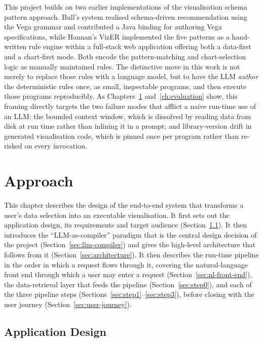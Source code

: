 This project builds on two earlier implementations of the visualisation schema pattern approach. Bull's system \cite{bull2023visualisation} realised schema-driven recommendation using the Vega grammar and contributed a Java binding for authoring Vega specifications, while Hannan's VizER \cite{hannan2024vizer} implemented the five patterns as a hand-written rule engine within a full-stack web application offering both a data-first and a chart-first mode. Both encode the pattern-matching and chart-selection logic as manually maintained rules. The distinctive move in this work is not merely to replace those rules with a language model, but to have the LLM \emph{author} the deterministic rules once, as small, inspectable programs, and then execute those programs reproducibly. As Chapters~\ref{ch:approach} and~\ref{ch:evaluation} show, this framing directly targets the two failure modes that afflict a naive run-time use of an LLM: the bounded context window, which is dissolved by reading data from disk at run time rather than inlining it in a prompt; and library-version drift in generated visualisation code, which is pinned once per program rather than re-risked on every invocation.

\chapter{Approach}
\label{ch:approach}

This chapter describes the design of the end-to-end system that transforms a user's data selection into an executable visualisation. It first sets out the application design, its requirements and target audience (Section~\ref{sec:app-design}). It then introduces the ``LLM-as-compiler'' paradigm that is the central design decision of the project (Section~\ref{sec:llm-compiler}) and gives the high-level architecture that follows from it (Section~\ref{sec:architecture}). It then describes the run-time pipeline in the order in which a request flows through it, covering the natural-language front end through which a user may enter a request (Section~\ref{sec:nl-front-end}), the data-retrieval layer that feeds the pipeline (Section~\ref{sec:step0}), and each of the three pipeline steps (Sections~\ref{sec:step1}--\ref{sec:step3}), before closing with the user journey (Section~\ref{sec:user-journey}).

\section{Application Design}
\label{sec:app-design}


